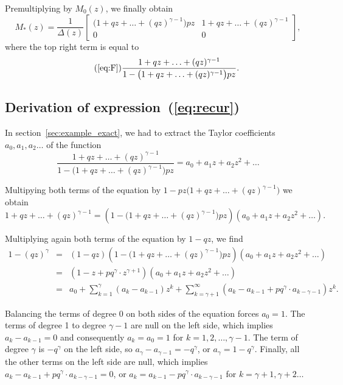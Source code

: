\documentclass{article}
\begin{document}
Premultiplying by $M_0(z)$, we finally obtain
\begin{equation*}
M_*(z) = \frac{1}{\Delta(z)}
\begin{bmatrix}
\big( 1+qz+\ldots+(qz)^{\gamma-1} \big) pz &
1+qz+\ldots+(qz)^{\gamma-1} \\
0 & 0 \end{bmatrix},
\end{equation*}
where the top right term is equal to
\begin{equation}
\tag{\ref{eq:F}}
\frac{1+qz+\ldots+(qz)^{\gamma-1}}
{1-\big( 1+qz+\ldots+(qz)^{\gamma-1} \big) pz}.
\end{equation}


\subsection{Derivation of expression~(\ref{eq:recur})}
\label{app_rec}

In section~\ref{sec:example_exact}, we had to extract the Taylor
coefficients $a_0, a_1, a_2 \ldots$ of the function
\begin{equation*}
\frac{1+qz+\ldots+(qz)^{\gamma-1}}
  {1-\big(1+qz+\ldots+(qz)^{\gamma-1} \big) pz} =
  a_0 + a_1z +a_2z^2 + \ldots
\end{equation*}

Multipying both terms of the equation by $1-pz
\big(1+qz+\ldots+(qz)^{\gamma-1} \big)$ we obtain
\begin{equation*}
1+qz+\ldots+(qz)^{\gamma-1} =
\left(1-\big(1+qz+\ldots+(qz)^{\gamma-1} \big) pz\right)
(a_0 + a_1z +a_2z^2 + \ldots).
\end{equation*}

Multiplying again both terms of the equation by $1-qz$, we find
\begin{eqnarray*}
1-(qz)^\gamma &=& (1-qz) \left(1- \big(1+qz+\ldots+(qz)^{\gamma-1}
\big) pz\right) (a_0 + a_1z +a_2z^2 + \ldots) \\
&=& (1-z+pq^\gamma \cdot z^{\gamma+1}) (a_0 + a_1z +a_2z^2 + \ldots) \\
&=& a_0 + \sum_{k=1}^{\gamma} (a_k-a_{k-1})z^k +
  \sum_{k=\gamma+1}^{\infty} (a_k-a_{k-1}+ pq^\gamma \cdot
a_{k-\gamma-1})z^k.
\end{eqnarray*}

Balancing the terms of degree 0 on both sides of the equation forces $a_0
= 1$. The terms of degree 1 to degree $\gamma-1$ are null on the left
side, which implies $a_k - a_{k-1} = 0$ and consequently $a_k = a_0 = 1$
for $k = 1, 2, \ldots, \gamma-1$. The term of degree $\gamma$ is
$-q^\gamma$ on the left side, so $a_\gamma-a_{\gamma-1} = -q^\gamma$, or
$a_\gamma = 1-q^\gamma$. Finally, all the other terms on the left side
are null, which implies $a_k-a_{k-1}+ pq^\gamma \cdot a_{k-\gamma-1} = 0$,
or $a_k = a_{k-1}-pq^\gamma\cdot a_{k-\gamma-1}$ for $k = \gamma+1,
\gamma+2 \ldots$
\end{document}
